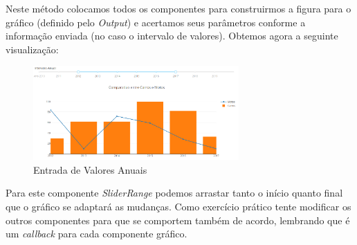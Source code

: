 \documentclass[a4paper,11pt]{article}
\begin{document}
Neste método colocamos todos os componentes para construirmos a figura para o gráfico (definido pelo \textit{Output}) e acertamos seus  parâmetros conforme a informação enviada (no caso o intervalo de valores). Obtemos agora a seguinte visualização:
\begin{figure}[H]
	\centering
	\includegraphics[width=0.7\textwidth]{imagem/parametro}
	\caption{Entrada de Valores Anuais}
\end{figure}

Para este componente \textit{SliderRange} podemos arrastar tanto o início quanto final que o gráfico se adaptará as mudanças. Como exercício prático tente modificar os outros componentes para que se comportem também de acordo, lembrando que é um \textit{callback} para cada componente gráfico.
\end{document}
